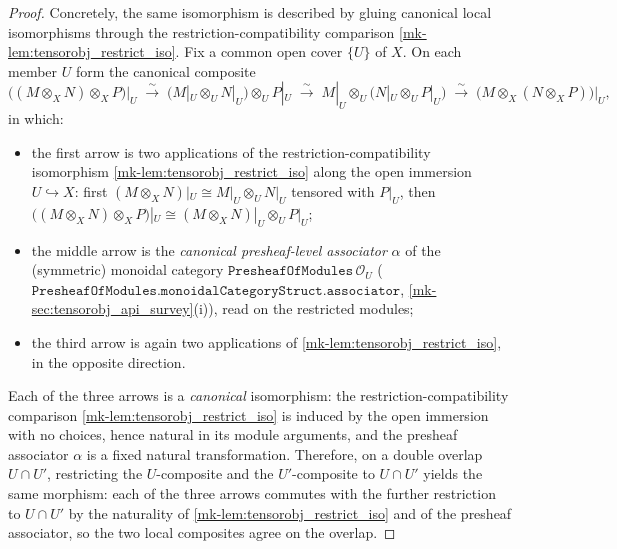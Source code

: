 \begin{lemma}
\begin{proof}
  Concretely, the same isomorphism is described by gluing canonical local isomorphisms
  through the restriction-compatibility comparison \ref{mk-lem:tensorobj_restrict_iso}.
  Fix a
  common open cover \(\{U\}\) of \(X\). On each member \(U\) form the canonical
  composite
  \[
    \bigl((M \otimes_X N) \otimes_X P\bigr)\big|_U
      \;\xrightarrow{\ \sim\ }\;
    \bigl(M|_U \otimes_U N|_U\bigr) \otimes_U P|_U
      \;\xrightarrow{\ \sim\ }\;
    M|_U \otimes_U \bigl(N|_U \otimes_U P|_U\bigr)
      \;\xrightarrow{\ \sim\ }\;
    \bigl(M \otimes_X (N \otimes_X P)\bigr)\big|_U ,
  \]
  in which:
  \begin{itemize}
    \item the first arrow is two applications of the restriction-compatibility
      isomorphism \ref{mk-lem:tensorobj_restrict_iso} along the open immersion
      \(U \hookrightarrow X\): first \((M \otimes_X N)|_U \cong M|_U \otimes_U
      N|_U\) tensored with \(P|_U\), then \(\bigl((M \otimes_X N) \otimes_X
      P\bigr)|_U \cong (M \otimes_X N)|_U \otimes_U P|_U\);
    \item the middle arrow is the \emph{canonical presheaf-level associator}
      \(\alpha\) of the (symmetric) monoidal category
      \(\mathtt{PresheafOfModules}\,\mathcal{O}_U\)
      (\(\mathtt{PresheafOfModules.monoidalCategoryStruct.associator}\),
      \ref{mk-sec:tensorobj_api_survey}(i)), read on the restricted modules;
    \item the third arrow is again two applications of
      \ref{mk-lem:tensorobj_restrict_iso}, in the opposite direction.
  \end{itemize}
  Each of the three arrows is a \emph{canonical} isomorphism: the
  restriction-compatibility comparison \ref{mk-lem:tensorobj_restrict_iso} is induced
  by the open immersion with no choices, hence natural in its module arguments, and
  the presheaf associator \(\alpha\) is a fixed natural transformation. Therefore,
  on a double overlap \(U \cap U'\), restricting the \(U\)-composite and the
  \(U'\)-composite to \(U \cap U'\) yields the same morphism: each of the three
  arrows commutes with the further restriction to \(U \cap U'\) by the naturality of
  \ref{mk-lem:tensorobj_restrict_iso} and of the presheaf associator, so the two local
  composites agree on the overlap.


\end{proof}
\end{lemma}
